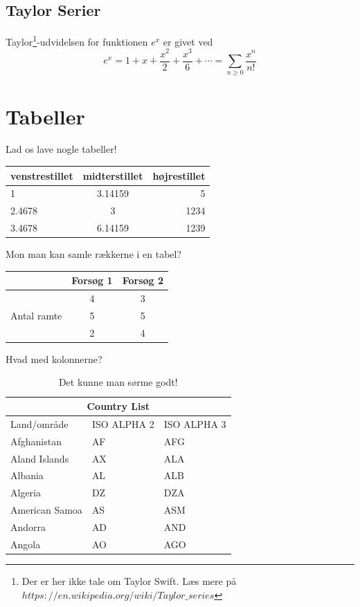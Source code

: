\documentclass[]{article} %
\begin{document}
\subsection{Taylor Serier}
Taylor\footnote{Der er her ikke tale om Taylor Swift. Læs mere på $https://en.wikipedia.org/wiki/Taylor\_series$}-udvidelsen for funktionen $e^x$ er givet ved
\[
	e^x = 1 + x + \frac{x^2}{2} + \frac{x^3}{6} + \cdots = \sum_{n\geq 0} \frac{x^n}{n!}
\]

\section{Tabeller}
Lad os lave nogle tabeller!

\begin{center}
	\noindent
	\begin{tabular}{l||c|r}
		venstrestillet & midterstillet & højrestillet \\ \hline
		1 & 3.14159 & 5 \\
		2.4678 & 3 &  1234 \\ \hline \hline
		3.4678 & 6.14159 & 1239
	\end{tabular}
\end{center}


Mon man kan samle rækkerne i en tabel?

\begin{center}
	\begin{tabular}{|c|c|c|} 
		\hline
		 & Forsøg 1 & Forsøg 2 \\
		\hline
		\multirow{3}{4em}{Antal ramte} & 4 & 3 \\ 
									   & 5 & 5 \\ 
									   & 2 & 4 \\ 
		\hline
	\end{tabular}
\end{center}
\newpage

Hvad med kolonnerne?
\begin{table}[h]
	\begin{center}
		\begin{tabular}{ |p{3cm}|p{3cm}|p{3cm}|  }
		\hline
		\multicolumn{3}{|c|}{Country List} \\
		\hline
		Land/område& ISO ALPHA 2 &ISO ALPHA 3 \\
		\hline
		Afghanistan & AF & AFG \\
		Aland Islands & AX   & ALA \\
		Albania &AL & ALB \\
		Algeria    &DZ & DZA \\
		American Samoa & AS & ASM \\
		Andorra & AD & AND   \\
		Angola & AO & AGO \\
		\hline
		\end{tabular}

		\caption{Det kunne man sørme godt!}
	\end{center}
\end{table}
\end{document}
